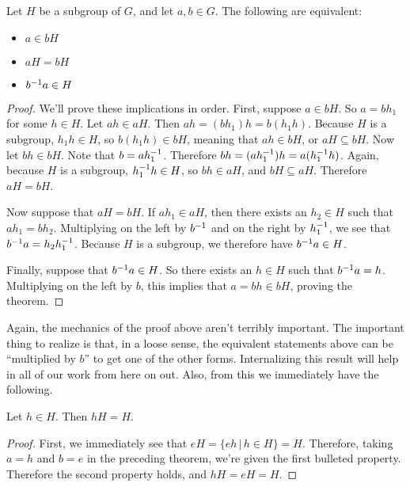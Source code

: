 \begin{theorem}
\label{cosets}
Let $H$ be a subgroup of $G$, and let $a, b \in G$. The following are equivalent:
\begin{itemize}
\item $a \in bH$
\item $aH = bH$
\item $b^{-1}a \in H$
\end{itemize}
\end{theorem}

\begin{proof}

We'll prove these implications in order. First, suppose $a \in bH$. So $a = bh_1$ for some $h \in H$. Let $ah \in aH$. Then $ah = (bh_1)h = b(h_1 h)$. Because $H$ is a subgroup, $h_1 h \in H$, so $b(h_1 h) \in bH$, meaning that $ah \in bH$, or $aH \subseteq bH$. Now let $bh \in bH$. Note that $b = a h_1^{-1}$. Therefore $bh = (a h_1^{-1})h = a (h_1^{-1}h)$. Again, because $H$ is a subgroup, $h_1^{-1} h \in H$, so $bh \in aH$, and $bH \subseteq aH$. Therefore $aH = bH$.

Now suppose that $aH = bH$. If $ah_1 \in aH$, then there exists an $h_2 \in H$ such that $ah_1 = bh_2$. Multiplying on the left by $b^{-1}$ and on the right by $h_1^{-1}$, we see that $b^{-1}a = h_2 h_1^{-1}$. Because $H$ is a subgroup, we therefore have $b^{-1}a \in H$.

Finally, suppose that $b^{-1}a \in H$. So there exists an $h \in H$ such that $b^{-1}a = h$. Multiplying on the left by $b$, this implies that $a = bh \in bH$, proving the theorem.

\end{proof}

Again, the mechanics of the proof above aren't terribly important. The important thing to realize is that, in a loose sense, the equivalent statements above can be ``multiplied by $b$'' to get one of the other forms. Internalizing this result will help in all of our work from here on out. Also, from this we immediately have the following.

\begin{corollary}
\label{cosetcorollary}
Let $h \in H$. Then $hH = H$.
\end{corollary}

\begin{proof}
First, we immediately see that $eH = \{eh \,|\, h \in H\} = H$. Therefore, taking $a=h$ and $b=e$ in the preceding theorem, we're given the first bulleted property. Therefore the second property holds, and $hH = eH = H$.

\end{proof}

